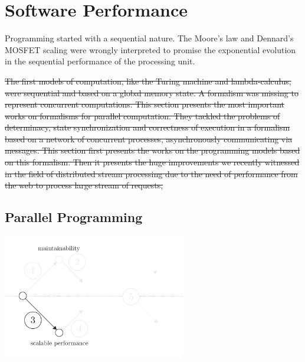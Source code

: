 \section{Software Performance} \label{chapter3:software-performance}


Programming started with a sequential nature.
The Moore's law \cite{Moore1965} and Dennard's MOSFET scaling \cite{Dennard2007} were wrongly interpreted to promise the exponential evolution in the sequential performance of the processing unit.


\sout{The first models of computation, like the Turing machine and lambda-calculus, were sequential and based on a global memory state.
A formalism was missing to represent concurrent computations.
This section presents the most important works on formalisms for parallel computation.
They tackled the problems of determinacy, state synchronization and correctness of execution in a formalism based on a network of concurrent processes, asynchronously communicating via messages.
This section first presents the works on the programming models based on this formalism.
Then it presents the huge improvements we recently witnessed in the field of distributed stream processing due to the need of performance from the web to process large stream of requests,}

\subsection{Parallel Programming}


\begin{center}
\includegraphics[width=0.6\textwidth]{../ressources/state-of-the-art-3.pdf}
\end{center}

